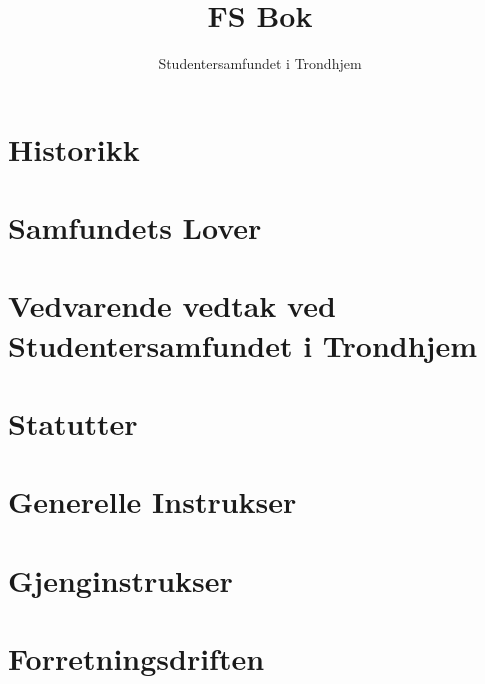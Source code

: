 \documentclass[11pt, a4paper, twosided]{book}
\title{FS Bok}
\author{Studentersamfundet i Trondhjem}
\newcounter{lovkapittel}
\newcounter{lovparagrafcounter}
\begin{document}

\cleardoublepage




\tableofcontents

\part{Historikk}




\part{Samfundets Lover}



\setcounter{lovkapittel}{1}
\setcounter{lovparagrafcounter}{1}


\part{Vedvarende vedtak ved Studentersamfundet i Trondhjem}



\part{Statutter}



\part{Generelle Instrukser}





\part{Gjenginstrukser}


%





\part{Forretningsdriften}



\end{document}
